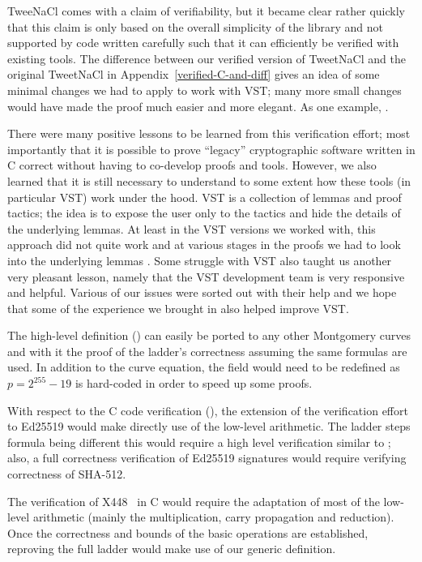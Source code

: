 TweeNaCl comes with a claim of verifiability, but it became clear
rather quickly that this claim is only based on the overall simplicity
of the library and not supported by code written carefully such that it can
efficiently be verified with existing tools. The difference between
our verified version of TweetNaCl and the original TweetNaCl in
Appendix~\ref{verified-C-and-diff} gives an idea of some minimal
changes we had to apply to work with VST; many more small changes
would have made the proof much easier and more elegant. As one
example, .

There were many positive lessons to be learned from this verification effort;
most importantly that it is possible to prove ``legacy'' cryptographic
software written in C correct without having to co-develop proofs
and tools. However, we also learned that it is still necessary to
understand to some extent how these tools (in particular VST)
work under the hood. 
VST is a collection of lemmas and proof tactics; the idea is
to expose the user only to the tactics and hide the details of
the underlying lemmas. At least in the VST versions we worked
with, this approach did not quite work and at various stages in
the proofs we had to look into the underlying lemmas .
Some struggle with VST also taught us another very pleasant lesson,
namely that the VST development team is very responsive and helpful.
Various of our issues were sorted out with their help and we hope
that some of the experience we brought in also helped improve VST.

The high-level definition () can easily be ported to any
other Montgomery curves and with it the proof of the ladder's correctness
assuming the same formulas are used.
In addition to the curve equation, the field  would need to be redefined
as $p=2^{255}-19$ is hard-coded in order to speed up some proofs.

With respect to the C code verification (), the extension of
the verification effort to Ed25519 would make directly use of the low-level
arithmetic. The ladder steps formula being different this would require a high
level verification similar to ;
also, a full correctness verification of Ed25519 signatures would require
verifying correctness of SHA-512.

The verification of \eg X448~\cite{cryptoeprint:2015:625,rfc7748} in C would
require the adaptation of most of the low-level arithmetic (mainly the
multiplication, carry propagation and reduction).
Once the correctness and bounds of the basic operations are established,
reproving the full ladder would make use of our generic definition.

